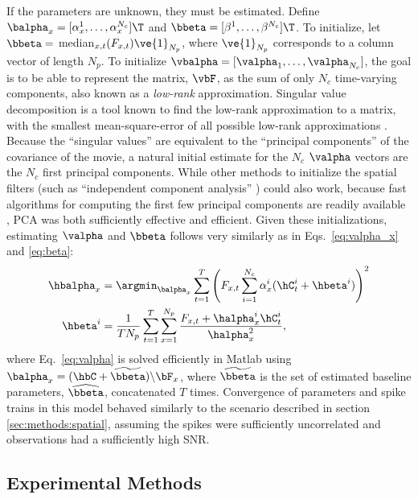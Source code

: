 If the parameters are unknown, they must be estimated. Define $\balpha_x=[\alpha_x^1, \ldots, \alpha_x^{N_c}]\T$ and $\bbeta=[\beta^1, \ldots, \beta^{N_c}]\T$.  To initialize, let $\bbeta=$ median$_{x,t}(F_{x,t})\ve{1}_{N_p}$, where $\ve{1}_{N_p}$ corresponds to a column vector of length $N_p$. To initialize $\vbalpha=[\valpha_1, \ldots, \valpha_{N_c}]$, the goal is to be able to represent the matrix, $\vbF$, as the sum of only $N_c$ time-varying components, also known as a \emph{low-rank} approximation.  Singular value decomposition is a tool known to find the low-rank approximation to a matrix, with the smallest mean-square-error of all possible low-rank approximations \cite{HornJohnson90}.  Because the ``singular values'' are equivalent to the ``principal components'' of the covariance of the movie, a natural initial estimate for the $N_c$ $\valpha$ vectors are the $N_c$ first principal components.  While other methods to initialize the spatial filters (such as ``independent component analysis'' \cite{MukamelSchnitzer09}) could also work, because fast algorithms for computing the first few principal components are readily available \cite{RokhlinTygert09}, PCA was both sufficiently effective and efficient.  Given these initializations, estimating $\valpha$ and $\bbeta$ follows very similarly as in Eqs.~\eqref{eq:valpha_x} and \eqref{eq:beta}:
\begin{align} \label{eq:valpha}
	\hbalpha_x &= \argmin_{\balpha_x} \sum_{t=1}^T  \left(F_{x,t}  \sum_{i=1}^{N_c} \alpha_x^i (\hC_t^i + \hbeta^i)\right)^2 \\
	\hbeta^i &= \frac{1}{T N_p} \sum_{t=1}^T \sum_{x=1}^{N_p} \frac{F_{x,t} + \halpha_x^i  \hC_t^i}{\halpha_x^2}, \label{eq:vbeta}
\end{align}
where Eq.~\eqref{eq:valpha} is solved efficiently in Matlab using $\balpha_x = (\hbC + \widetilde{\bbeta})\backslash \bF_x$, where $\widetilde{\bbeta}$ is the set of estimated baseline parameters, $\widehat{\bbeta}$, concatenated $T$ times.  Convergence of parameters and spike trains in this model behaved similarly to the scenario described in section \ref{sec:methods:spatial}, assuming the spikes were sufficiently uncorrelated and observations had a sufficiently high SNR.





\subsection{Experimental Methods} \label{sec:exp}

